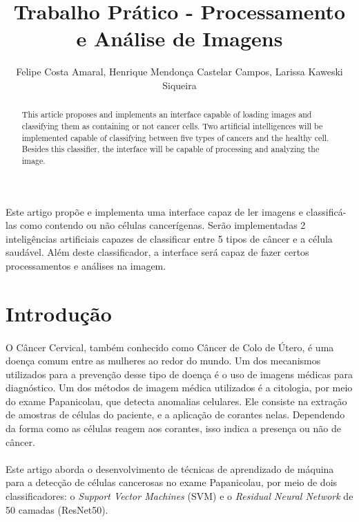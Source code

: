 \documentclass[12pt]{article}
\title{Trabalho Prático - Processamento e Análise de Imagens}
\author{Felipe Costa Amaral, Henrique Mendonça Castelar Campos, Larissa Kaweski Siqueira}
\begin{document}
 

\maketitle

     
\begin{abstract} 
This article proposes and implements an interface capable of loading images and classifying them as containing or not cancer cells. Two artificial intelligences will be implemented capable of classifying between five types of cancers and the healthy cell.
Besides this classifier, the interface will be capable of processing and analyzing the image.
\end{abstract}
     
\begin{resumo} 
Este artigo propõe e implementa uma interface capaz de ler imagens e classificá-las como contendo ou não células cancerígenas. Serão implementadas 2 inteligências artificiais capazes de classificar entre 5 tipos de câncer e a célula saudável.
Além deste classificador, a interface será capaz de fazer certos processamentos e análises na imagem.
\end{resumo}

\section{Introdução}

\paragraph{}O Câncer Cervical, também conhecido como Câncer de Colo de Útero, é uma doença comum entre as mulheres ao redor do mundo. Um dos mecanismos utilizados para a prevenção desse tipo de doença é o uso de imagens médicas para diagnóstico. Um dos métodos de imagem médica utilizados é a citologia, por meio do exame Papanicolau, que detecta anomalias celulares. Ele consiste na extração de amostras de células do paciente, e a aplicação de corantes nelas. Dependendo da forma como as células reagem aos corantes, isso indica a presença ou não de câncer.

\paragraph{}Este artigo aborda o desenvolvimento de técnicas de aprendizado de máquina para a detecção de células cancerosas no exame Papanicolau, por meio de dois classificadores: o \textit{Support Vector Machines} (SVM) e o \textit{Residual Neural Network} de 50 camadas (ResNet50).
\end{document}
